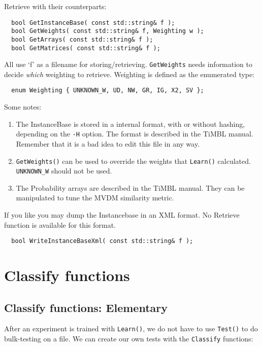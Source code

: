 \documentclass{report}
\begin{document}
Retrieve with their counterparts:

\begin{footnotesize}
\begin{verbatim}
  bool GetInstanceBase( const std::string& f );
  bool GetWeights( const std::string& f, Weighting w );
  bool GetArrays( const std::string& f );
  bool GetMatrices( const std::string& f );
\end{verbatim}
\end{footnotesize}

All use `f' as a filename for storing/retrieving. {\tt GetWeights} needs
information to decide {\em which}\/ weighting to retrieve.
Weighting is defined as the enumerated type:

\begin{footnotesize}
\begin{verbatim}
  enum Weighting { UNKNOWN_W, UD, NW, GR, IG, X2, SV };
\end{verbatim}
\end{footnotesize}

Some notes:

\begin{enumerate}
\item The InstanceBase is stored in a internal format, with or without
hashing, depending on the {\tt -H} option. The format is described in the
TiMBL manual. Remember that it is a bad idea to edit this file in any way.
\item {\tt GetWeights()} can be used to override the weights that
{\tt Learn()} calculated. {\tt UNKNOWN\_W} should not be used.
\item The Probability arrays are described in the TiMBL manual. They can be
manipulated to tune the MVDM similarity metric.
\end{enumerate}

If you like you may dump the Instancebase in an XML format. No Retrieve
function is available for this format.

\begin{footnotesize}
\begin{verbatim}
  bool WriteInstanceBaseXml( const std::string& f );
\end{verbatim}
\end{footnotesize}

\chapter{Classify functions}

\section{Classify functions: Elementary}
After an experiment is trained with {\tt Learn()}, we do not have to use
{\tt Test()} to do bulk-testing on a file.
We can create our own tests with the {\tt Classify} functions:
\end{document}
